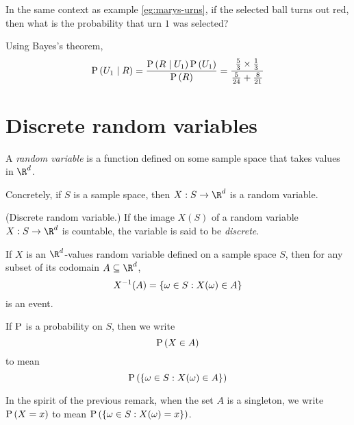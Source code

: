 \documentclass[11pt]{article}
\begin{document}
\begin{eg}
    In the same context as example \ref{eg:marys-urns}, if the selected ball
    turns out red, then what is the probability that urn $1$ was selected?
\end{eg}

\begin{solution}
    Using Bayes's theorem,
    \begin{equation*}
        \P{U_1 \given R}
        = \frac{\P{R \given U_1} \P{U_1}}{\P{R}}
        = \frac{\frac{5}{3} \times \frac{1}{3}}{\frac{5}{24} + \frac{8}{21}}
    \end{equation*}
\end{solution}

\section{Discrete random variables}

\begin{defn}
    A \emph{random variable} is a function defined on some sample space that
    takes values in $\R^d$.

    Concretely, if $S$ is a sample space, then $X : S \to \R^d$ is a random
    variable.
\end{defn}

\begin{defn}{(Discrete random variable.)}
    If the image $X(S)$ of a random variable $X : S \to \R^d$ is countable, the
    variable is said to be \emph{discrete}.
\end{defn}

\begin{rem}
    If $X$ is an $\R^d$-values random variable defined on a sample space $S$,
    then for any subset of its codomain $A \subseteq \R^d$,
    \begin{equation}
        \label{eq:random-variable-preimage}
        X\inv (A) = \{\omega \in S : X(\omega) \in A\}
    \end{equation}
    is an event.

    If $\Prob$ is a probability on $S$, then we write
    \begin{equation*}
        \P{X \in A}
    \end{equation*}
    to mean
    \begin{equation*}
        \P{\{\omega \in S : X(\omega) \in A\}}
    \end{equation*}
\end{rem}

\begin{rem}
    In the spirit of the previous remark, when the set $A$ is a singleton, we
    write $\P{X = x}$ to mean $\P{\{\omega \in S : X(\omega) = x\}}$.
\end{rem}
\end{document}
